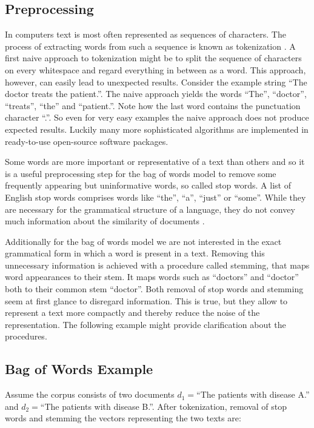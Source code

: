 \subsection*{Preprocessing}
In computers text is most often represented as sequences of characters. The process of extracting words from such a sequence is known as tokenization \citep{Manning2008prepr}. A first naive approach to tokenization might be to
split the sequence of characters on every whitespace and regard everything
in between as a word. This approach, however, can easily lead to unexpected
results. Consider the example string ``The doctor treats the patient.''. The naive
approach yields the words ``The'', ``doctor'', ``treats'', ``the'' and ``patient.''.
Note how the last word contains the punctuation character ``.''.
So even for very easy examples the naive approach does not produce
expected results. Luckily many more sophisticated algorithms are implemented
in ready-to-use open-source software packages.

Some words are more important or representative of a text than others and so it is a useful preprocessing step for the bag of words model to remove some frequently appearing but uninformative words, so called stop words. A list of English stop words comprises words like ``the'', ``a'', ``just'' or ``some''.  While they are necessary for the
grammatical structure of a language, they do not convey much information
about the similarity of documents \citep{Manning2008prepr}.

Additionally for the bag of words model we are not interested in the exact grammatical form in which a word is present in a text. Removing this unnecessary information is achieved with a procedure called stemming, that maps word appearances to their stem. It maps words such as ``doctors'' and ``doctor'' both to their common stem ``doctor''. Both removal of stop words and stemming seem at first glance to disregard information. This is true, but they allow to represent a text more compactly and thereby reduce the noise of the representation. The following example might provide clarification about the procedures.

\subsection*{Bag of Words Example}
Assume the corpus
consists of two documents $d_{1}=$``The patients with disease A.'' and $d_{2}=$``The patients with disease B.''. After tokenization, removal of stop words and stemming the vectors representing the two texts are:

